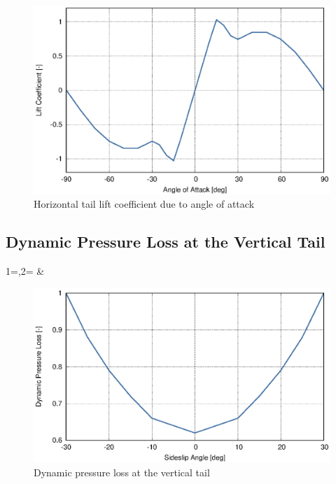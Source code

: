 \begin{figure}
  \centering
  \includegraphics[width=140mm]{eps/uh60_stab_h_cz.eps}
  \caption{Horizontal tail lift coefficient due to angle of attack \cite{NASA-CR-166309}}
\end{figure}


\clearpage
\subsection{Dynamic Pressure Loss at the Vertical Tail}

{1=\colbeta,2=\coldyn}
{\colbeta & \coldyn}

\begin{figure}[h!]
  \centering
  \includegraphics[width=140mm]{eps/uh60_stab_v_press_loss.eps}
  \caption{Dynamic pressure loss at the vertical tail \cite{NASA-CR-166309}}
\end{figure}

